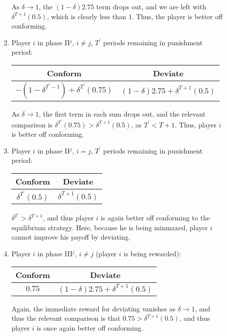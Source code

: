 \documentclass[11pt]{article}
\begin{document}
\begin{enumerate}
\begin{enumerate}
\begin{enumerate}[label = \roman{*})]
			As $ \delta\to 1 $, the $ (1 - \delta)2.75 $ term drops out, and we are left with $ \delta^{T+1}(0.5) $, which is clearly less than 1. Thus, the player is better off conforming. 
			
			\item Player $ i $ in phase II$ ^j $, $ i \neq j $, $ T^\prime $ periods remaining in punishment period: 
			\begin{table}[!h]
				\centering
				\begin{tabular}{c|c}
					Conform & Deviate \\ \hline
					$ -(1 - \delta^{T^\prime - 1}) + \delta^{T^\prime}(0.75) $ & $ (1 - \delta)2.75 + \delta^{T+1}(0.5) $
				\end{tabular}
			\end{table}
			
			As $ \delta\to 1 $, the first term in each sum drops out, and the relevant comparison is $ \delta^{T^\prime}(0.75) > \delta^{T+1}(0.5)$, as $ T^\prime < T+1 $. Thus, player $ i $ is better off conforming.
			
			\item Player $ i $ in phase II$ ^j $, $ i = j $, $ T^\prime $ periods remaining in punishment period:
			\begin{table}[!h]
				\centering
				\begin{tabular}{c|c}
					Conform & Deviate \\ \hline
					$ \delta^{T^\prime} (0.5) $ & $ \delta^{T+1}(0.5) $
				\end{tabular}
			\end{table}
		
			$ \delta^{T^\prime} > \delta^{T+1}$, and thus player $ i $ is again better off conforming to the equilibrium strategy. Here, because he is being minmaxed, player $ i $ cannot improve his payoff by deviating. 
			
			\item Player $ i $ in phase III$ ^j $, $ i\neq j $ (player $ i $ is being rewarded):
			\begin{table}[!h]
				\centering
				\begin{tabular}{c|c}
					Conform & Deviate \\ \hline
					$ 0.75 $ & $ (1 - \delta)2.75 + \delta^{T+1}(0.5) $
				\end{tabular}
			\end{table}
			
			Again, the immediate reward for deviating vanishes as $ \delta\to 1 $, and thus the relevant comparison is that $ 0.75 > \delta^{T+1}(0.5) $, and thus player $ i $ is once again better off conforming.
			

\end{enumerate}
\end{enumerate}
\end{enumerate}
\end{document}
